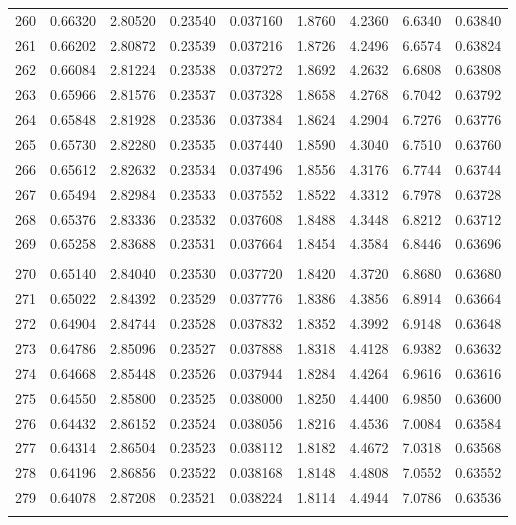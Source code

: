 \documentclass[letter,twosides,10pt]{article}
\begin{document}
\begin{longtable}{|c|c|c|c|c|c|c|c|c|}
260 & 0.66320 & 2.80520 & 0.23540 & 0.037160 & 1.8760 & 4.2360 & 6.6340 & 0.63840 \\
261 & 0.66202 & 2.80872 & 0.23539 & 0.037216 & 1.8726 & 4.2496 & 6.6574 & 0.63824 \\
262 & 0.66084 & 2.81224 & 0.23538 & 0.037272 & 1.8692 & 4.2632 & 6.6808 & 0.63808 \\
263 & 0.65966 & 2.81576 & 0.23537 & 0.037328 & 1.8658 & 4.2768 & 6.7042 & 0.63792 \\
264 & 0.65848 & 2.81928 & 0.23536 & 0.037384 & 1.8624 & 4.2904 & 6.7276 & 0.63776 \\
265 & 0.65730 & 2.82280 & 0.23535 & 0.037440 & 1.8590 & 4.3040 & 6.7510 & 0.63760 \\
266 & 0.65612 & 2.82632 & 0.23534 & 0.037496 & 1.8556 & 4.3176 & 6.7744 & 0.63744 \\
267 & 0.65494 & 2.82984 & 0.23533 & 0.037552 & 1.8522 & 4.3312 & 6.7978 & 0.63728 \\
268 & 0.65376 & 2.83336 & 0.23532 & 0.037608 & 1.8488 & 4.3448 & 6.8212 & 0.63712 \\
269 & 0.65258 & 2.83688 & 0.23531 & 0.037664 & 1.8454 & 4.3584 & 6.8446 & 0.63696 \\
 & & & & & & & & \\
270 & 0.65140 & 2.84040 & 0.23530 & 0.037720 & 1.8420 & 4.3720 & 6.8680 & 0.63680 \\
271 & 0.65022 & 2.84392 & 0.23529 & 0.037776 & 1.8386 & 4.3856 & 6.8914 & 0.63664 \\
272 & 0.64904 & 2.84744 & 0.23528 & 0.037832 & 1.8352 & 4.3992 & 6.9148 & 0.63648 \\
273 & 0.64786 & 2.85096 & 0.23527 & 0.037888 & 1.8318 & 4.4128 & 6.9382 & 0.63632 \\
274 & 0.64668 & 2.85448 & 0.23526 & 0.037944 & 1.8284 & 4.4264 & 6.9616 & 0.63616 \\
275 & 0.64550 & 2.85800 & 0.23525 & 0.038000 & 1.8250 & 4.4400 & 6.9850 & 0.63600 \\
276 & 0.64432 & 2.86152 & 0.23524 & 0.038056 & 1.8216 & 4.4536 & 7.0084 & 0.63584 \\
277 & 0.64314 & 2.86504 & 0.23523 & 0.038112 & 1.8182 & 4.4672 & 7.0318 & 0.63568 \\
278 & 0.64196 & 2.86856 & 0.23522 & 0.038168 & 1.8148 & 4.4808 & 7.0552 & 0.63552 \\
279 & 0.64078 & 2.87208 & 0.23521 & 0.038224 & 1.8114 & 4.4944 & 7.0786 & 0.63536 \\
 & & & & & & & & \\

\end{longtable}
\end{document}
